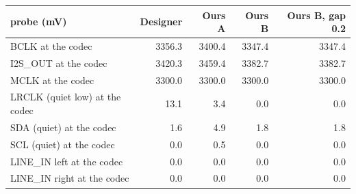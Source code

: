 \begin{tabular}{p{5.6cm}rrrr}
\toprule
probe (mV) & Designer & Ours A & Ours B & Ours B, gap 0.2 \\
\midrule
BCLK at the codec & 3356.3 & 3400.4 & 3347.4 & 3347.4 \\
I2S\_OUT at the codec & 3420.3 & 3459.4 & 3382.7 & 3382.7 \\
MCLK at the codec & 3300.0 & 3300.0 & 3300.0 & 3300.0 \\
LRCLK (quiet low) at the codec & 13.1 & 3.4 & 0.0 & 0.0 \\
SDA (quiet) at the codec & 1.6 & 4.9 & 1.8 & 1.8 \\
SCL (quiet) at the codec & 0.0 & 0.5 & 0.0 & 0.0 \\
LINE\_IN left at the codec & 0.0 & 0.0 & 0.0 & 0.0 \\
LINE\_IN right at the codec & 0.0 & 0.0 & 0.0 & 0.0 \\
\bottomrule
\end{tabular}
